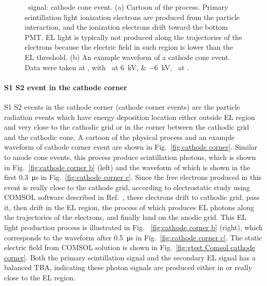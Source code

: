 \begin{figure}[!htbp]
\begin{subfigure}[b]{0.7\textwidth}
		\caption{}
		\label{fig:}
	\end{subfigure}
	\caption[\gtest\ signal: cathode cone event.]{\gtest\ signal: cathode cone event. (a) Cartoon of the process. Primary scintillation light ionization electrons are produced from the particle interaction, and the ionization electrons drift toward the bottom PMT. EL light is typically not produced along the trajectories of the electrons because the electric field in such region is lower than the EL threshold. (b) An example waveform of a cathode cone event. Data were taken at , with \opvtvb\ at \SIlist{+6;-6}{kV}, \opgd\ at \standarddensity .%
	}
	\label{fig:cathode cone}
\end{figure}

\paragraph[]{S1 S2 event in the cathode corner}
\label{sec:events particle cathode corner}
S1 S2 events in the cathode corner (cathode corner events) are the particle radiation events which have energy deposition location either outside EL region and very close to the cathodic grid or in the corner between the cathodic grid and the cathodic cone. A cartoon of the physical process and an example waveform of cathode corner event are shown in Fig.~\ref{fig:cathode corner}. Similar to anode cone events, this process produce scintillation photons, which is shown in Fig.~\ref{fig:cathode corner b} (left) and the waveform of which is shown in the first \SI{0.3}{\us} in Fig.~\ref{fig:cathode corner c}. Since the free electrons produced in this event is really close to the cathode grid, according to electrostatic study using COMSOL software described in Ref.~\cite{COMSOL2018}, these electrons drift to cathodic grid, pass it, then drift in the EL region, the process of which produces EL photons along the trajectories of the electrons, and finally land on the anodic grid. This EL light production process is illustrated in Fig. ~\ref{fig:cathode corner b} (right), which corresponds to the waveform after \SI{0.5}{\us} in Fig.~\ref{fig:cathode corner c}. The static electric field from COMSOL solution is shown in Fig.~\ref{fig:gtest Comsol cathode corner}. Both the primary scintillation signal  and the secondary EL signal has a balanced TBA, indicating these photon signals are produced either in or really close to the EL region. 

